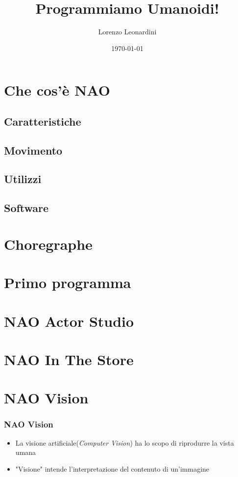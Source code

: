 \documentclass[aspectratio=169]{beamer}
\title{Programmiamo Umanoidi!}
\subtitle{}
\author{Lorenzo Leonardini}
\institute{Scuola di Robotica}
\date{\today}
\begin{document}
\begin{frame}
	\titlepage
\end{frame}

\section{Che cos'è NAO}
\subsection{Caratteristiche}
\subsection{Movimento}
\subsection{Utilizzi}
\subsection{Software}
\section{Choregraphe}
\section{Primo programma}
\section{NAO Actor Studio}
\section{NAO In The Store}

\fi

\section{NAO Vision}

\begin{frame}
\frametitle{NAO Vision}
\begin{itemize}
	\item<1-> La visione artificiale(\textit{Computer Vision}) ha lo scopo di riprodurre la vista umana
	\item<2-> "Visione" intende l'interpretazione del contenuto di un'immagine
\end{itemize}
\end{frame}
\end{document}
